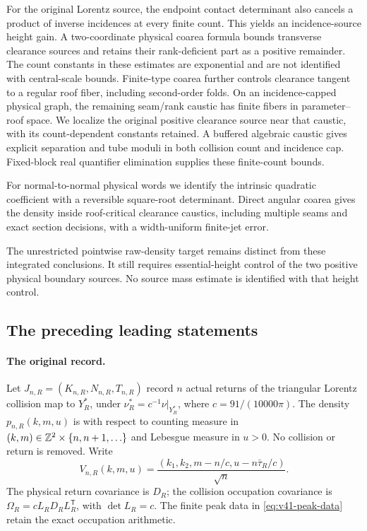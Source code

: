 For the original Lorentz source, the endpoint contact determinant also
cancels a product of inverse incidences at every finite count. This yields
an incidence-source height gain. A two-coordinate physical coarea formula
bounds transverse clearance sources and retains their rank-deficient
part as a positive remainder. The count constants in these estimates
are exponential and are not identified with central-scale bounds.
Finite-type coarea further controls clearance tangent to a regular
roof fiber, including second-order folds. On an incidence-capped
physical graph, the remaining seam/rank caustic has finite fibers in
parameter--roof space. We localize the original positive clearance
source near that caustic, with its count-dependent constants retained.
A buffered algebraic caustic gives explicit separation and tube moduli
in both collision count and incidence cap. Fixed-block real quantifier
elimination supplies these finite-count bounds.

For normal-to-normal physical words we identify the intrinsic quadratic
coefficient with a reversible square-root determinant. Direct angular
coarea gives the density inside roof-critical clearance caustics,
including multiple seams and exact section decisions, with a
width-uniform finite-jet error.

The unrestricted pointwise raw-density target remains distinct from
these integrated conclusions. It still requires essential-height
control of the two positive physical boundary sources. No source
mass estimate is identified with that height control.
\subsection*{The preceding leading statements}

\paragraph{The original record.}
Let $J_{n,R}=(K_{n,R},N_{n,R},T_{n,R})$ record $n$ actual returns
of the triangular Lorentz collision map to $Y_R^*$, under
$\nu_R^*=c^{-1}\nu|_{Y_R^*}$, where $c=91/(10000\pi)$.
The density $p_{n,R}(k,m,u)$ is with respect to counting measure in
$(k,m)\in\mathbb Z^2\times\{n,n+1,\ldots\}$ and Lebesgue measure in $u>0$.
No collision or return is removed. Write
\[
 V_{n,R}(k,m,u)=
       \frac{(k_1,k_2,m-n/c,u-n\bar\tau_R/c)}{\sqrt n}.
\]
The physical return covariance is $D_R$; the collision occupation
covariance is $\Omega_R=cL_RD_RL_R^{\mathsf T}$, with
$\det L_R=c$. The finite peak data in
\eqref{eq:v41-peak-data} retain the exact occupation arithmetic.

